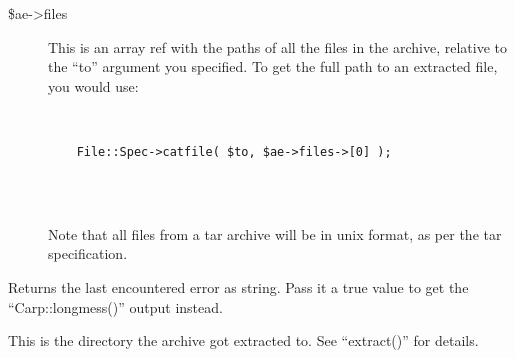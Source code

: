 \documentclass[]{article}
\begin{document}
\begin{description}
\item[\$ae-\textgreater{}files]
This is an array ref with the paths of all the files in the archive,
relative to the ``to'' argument you specified. To get the full path to
an extracted file, you would use:

~

\begin{verbatim}
    File::Spec->catfile( $to, $ae->files->[0] );
    
\end{verbatim}

~

Note that all files from a tar archive will be in unix format, as per
the tar specification.
\end{description}



Returns the last encountered error as string. Pass it a true value to
get the ``Carp::longmess()'' output instead.


This is the directory the archive got extracted to. See ``extract()''
for details.

\end{document}
